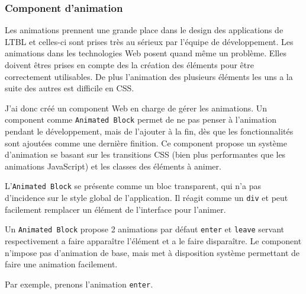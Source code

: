 \subsubsection{Component d'animation}
\label{animationblock}

Les animations prennent une grande place dans le design des applications de LTBL et celles-ci sont prises très au sérieux par l'équipe de développement.
Les animations dans les technologies Web posent quand même un problème.
Elles doivent êtres prises en compte des la création des éléments pour être correctement utilisables.
De plus l'animation des plusieurs éléments les uns a la suite des autres est difficile en CSS.

J'ai donc créé un component Web en charge de gérer les animations.
Un component comme \texttt{Animated Block} permet de ne pas penser à l'animation pendant le développement, mais de l'ajouter à la fin, dès que les fonctionnalités sont ajoutées comme une dernière finition.
Ce component propose un système d'animation se basant sur les transitions CSS (bien plus performantes que les animations JavaScript) et les classes des éléments à animer.

L'\texttt{Animated Block} se présente comme un bloc transparent, qui n'a pas d'incidence sur le style global de l'application.
Il réagit comme un \texttt{div} et peut facilement remplacer un élément de l'interface pour l'animer.

Un \texttt{Animated Block} propose 2 animations par défaut \texttt{enter} et \texttt{leave} servant respectivement a faire apparaître l'élément et a le faire disparaître.
Le component n'impose pas d'animation de base, mais met à disposition système permettant de faire une animation facilement.

Par exemple, prenons l'animation \texttt{enter}.

